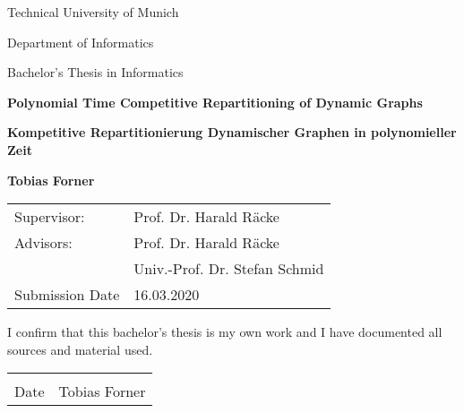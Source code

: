 	\begin{titlepage}
		\begin{center}
			\vspace*{1cm}
			
			\large
			Technical University of Munich\\
			\vspace*{1cm}
			
			Department of Informatics\\
			\vspace*{1cm}
			
			Bachelor's Thesis in Informatics\\
			\vspace*{1cm}
			
			\Huge
			\textbf{Polynomial Time Competitive Repartitioning of Dynamic Graphs}\\
			
			\vspace{1.5cm}
			
			\textbf{Kompetitive Repartitionierung Dynamischer Graphen in polynomieller Zeit}
			
			\vspace{2cm}
			
			\Large
			\textbf{Tobias Forner}
			
			\vspace{2cm}
			
			\large
			\begin{tabular}{l l}
				Supervisor: & Prof. Dr. Harald R\"acke\\
				Advisors: & Prof. Dr. Harald R\"acke\\
				${}$ & Univ.-Prof. Dr. Stefan Schmid\\
				Submission Date & 16.03.2020
			\end{tabular}
		
		
			
			\vfill
			
		\end{center}
	\end{titlepage}
	
	
	\thispagestyle{empty}
	\noindent I confirm that this bachelor's thesis is my own work and I have documented all sources and material used.\nl\nl
	\begin{center}
		\noindent\begin{tabular}{cc}
			\makebox[2.5in]{\hrulefill} & \makebox[2.5in]{\hrulefill}\\
			Date &	Tobias Forner
			
		\end{tabular}
		
	\end{center}
	
	
	\clearpage